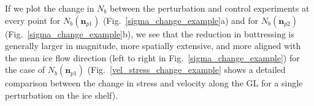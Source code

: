 \documentclass[tc, manuscript]{copernicus}
\begin{document}
If we plot the change in $N_b$ between the perturbation and control experiments at every point for $N_b(\mathbf{n}_{p1})$ (Fig.~\ref{sigma_change_example}a) and for $N_b(\mathbf{n}_{p2})$ (Fig.~\ref{sigma_change_example}b), we see that the reduction in buttressing is generally larger in magnitude, more spatially extensive, and more aligned with the mean ice flow direction (left to right in Fig.~\ref{sigma_change_example}) for the case of $N_b(\mathbf{n}_{p1})$ (Fig.~\ref{vel_stress_change_example} shows a detailed comparison between the change in stress and velocity along the GL for a single perturbation on the ice shelf). 


\end{document}
